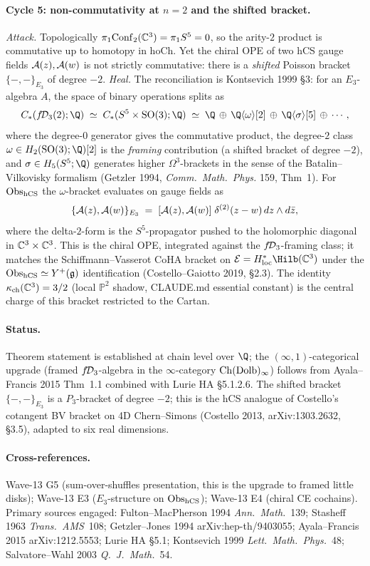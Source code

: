 \paragraph{Cycle 5: non-commutativity at $n=2$ and the shifted bracket.}
\emph{Attack.} Topologically $\pi_1 \mathrm{Conf}_2(\mathbb{C}^3) = \pi_1 S^5 = 0$,
so the arity-$2$ product is commutative up to homotopy in
$\mathrm{hoCh}$. Yet the chiral OPE of two hCS gauge fields
$\mathcal{A}(z),\mathcal{A}(w)$ is not strictly commutative: there is a
\emph{shifted} Poisson bracket $\{-,-\}_{E_3}$ of degree $-2$.
\emph{Heal.} The reconciliation is Kontsevich 1999 \S3: for an
$E_3$-algebra $A$, the space of binary operations splits as
\[
  C_*(\fD_3(2);\Q) \;\simeq\; C_*(S^5 \times \SO(3);\Q)
  \;\simeq\; \Q \,\oplus\, \Q\langle \omega\rangle[2]
  \,\oplus\, \Q\langle \sigma\rangle[5] \,\oplus\,\cdots,
\]
where the degree-$0$ generator gives the commutative product,
the degree-$2$ class $\omega \in H_2(\SO(3);\Q)[2]$ is the
\emph{framing} contribution (a shifted bracket of degree $-2$),
and $\sigma \in H_5(S^5;\Q)$ generates higher $\Omega^{3}$-brackets
in the sense of the Batalin--Vilkovisky formalism (Getzler 1994,
\emph{Comm.\ Math.\ Phys.} 159, Thm~1). For $\mathrm{Obs}_{\mathrm{hCS}}$ the
$\omega$-bracket evaluates on gauge fields as
\[
  \{\mathcal{A}(z),\mathcal{A}(w)\}_{E_3}
  \;=\; [\mathcal{A}(z),\mathcal{A}(w)]\;\delta^{(2)}(z-w)\,dz\wedge d\bar z,
\]
where the delta-$2$-form is the $S^5$-propagator pushed to the
holomorphic diagonal in $\mathbb{C}^3 \times \mathbb{C}^3$. This is the chiral
OPE, integrated against the $f\!\mathcal{D}_3$-framing class; it matches
the Schiffmann--Vasserot CoHA bracket on $\cE = H^*_{\mathrm{loc}}
\Hilb(\C^3)$ under the $\mathrm{Obs}_{\mathrm{hCS}} \simeq Y^+(\mathfrak{g})$ identification
(Costello--Gaiotto 2019, \S2.3). The identity
$\kappa_{\mathrm{ch}}(\mathbb{C}^3) = 3/2$ (local $\mathbb{P}^2$
shadow, CLAUDE.md essential constant) is the central charge
of this bracket restricted to the Cartan.

\paragraph{Status.} Theorem statement is established at chain
level over $\Q$; the $(\infty,1)$-categorical upgrade (framed
$f\!\mathcal{D}_3$-algebra in the $\infty$-category $\mathrm{Ch}(\mathrm{Dolb})_\infty$)
follows from Ayala--Francis 2015 Thm~1.1 combined with Lurie HA
\S5.1.2.6. The shifted bracket $\{-,-\}_{E_3}$ is a $P_3$-bracket
of degree $-2$; this is the hCS analogue of Costello's cotangent
BV bracket on 4D Chern--Simons (Costello 2013, arXiv:1303.2632,
\S3.5), adapted to six real dimensions.

\paragraph{Cross-references.} Wave-13 G5 (sum-over-shuffles
presentation, this is the upgrade to framed little disks);
Wave-13 E3 ($E_3$-structure on $\mathrm{Obs}_{\mathrm{hCS}}$);
Wave-13 E4 (chiral CE cochains). Primary sources engaged:
Fulton--MacPherson 1994 \emph{Ann.~Math.}~139;
Stasheff 1963 \emph{Trans.~AMS}~108;
Getzler--Jones 1994 arXiv:hep-th/9403055;
Ayala--Francis 2015 arXiv:1212.5553;
Lurie HA \S5.1; Kontsevich 1999 \emph{Lett.~Math.~Phys.}~48;
Salvatore--Wahl 2003 \emph{Q.~J.~Math.}~54.
